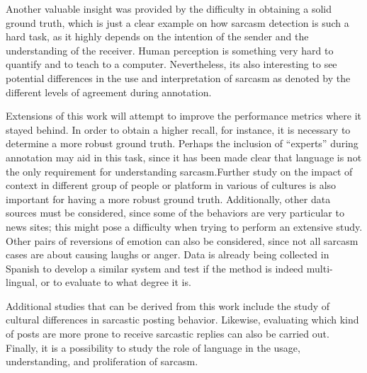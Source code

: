 \documentclass[12pt,a4paper]{report}
\theoremstyle{definition}
\begin{document}
\begin{CJK}{UTF8}{bsmi}
    \par Another valuable insight was provided by the difficulty in obtaining a solid ground truth, which is just a clear example on how sarcasm detection is such a hard task, as it highly depends on the intention of the sender and the understanding of the receiver. Human perception is something very hard to quantify and to teach to a computer. Nevertheless, its also interesting to see potential differences in the use and interpretation of sarcasm as denoted by the different levels of agreement during annotation.
    
    \par Extensions of this work will attempt to improve the performance metrics where it stayed behind. In order to obtain a higher recall, for instance, it is necessary to determine a more robust ground truth. Perhaps the inclusion of “experts” during annotation may aid in this task, since it has been made clear that language is not the only requirement for understanding sarcasm.Further study on the impact of context in different group of people or platform in various of cultures is also important for having a more robust ground truth.
    Additionally, other data sources must be considered, since some of the behaviors are very particular to news sites; this might pose a difficulty when trying to perform an extensive study. Other pairs of reversions of emotion can also be considered, since not all sarcasm cases are about causing laughs or anger. Data is already being collected in Spanish to develop a similar system and test if the method is indeed multi-lingual, or to evaluate to what degree it is.
    
    \par Additional studies that can be derived from this work include the study of cultural differences in sarcastic posting behavior. Likewise, evaluating which kind of posts are more prone to receive sarcastic replies can also be carried out. Finally, it is a possibility to study the role of language in the usage, understanding, and proliferation of sarcasm.





\newpage
\end{CJK}
\end{document}
